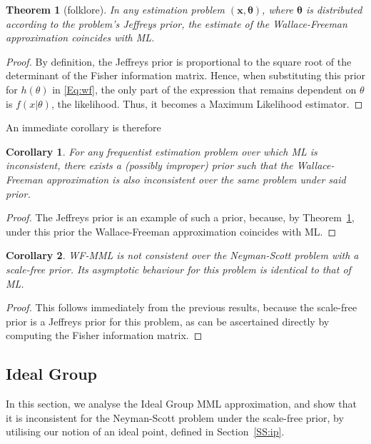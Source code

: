 \documentclass{IEEEtran}
\newtheorem{thm}{Theorem}
\newtheorem{cor}{Corollary}[thm]
\begin{document}
\begin{thm}[folklore]\label{T:mml}
In any estimation problem $(\mathbf{x},\boldsymbol{\theta})$, where
$\boldsymbol{\theta}$ is distributed according to the problem's Jeffreys prior,
the estimate of the Wallace-Freeman approximation coincides with ML.
\end{thm}

\begin{proof}
By definition, the Jeffreys prior is proportional to the square root of the
determinant of the Fisher information matrix.
Hence, when substituting this prior for $h(\theta)$ in \eqref{Eq:wf}, the
only part of the expression that remains dependent on $\theta$ is
$f(x|\theta)$, the likelihood. Thus, it becomes a Maximum Likelihood estimator.
\end{proof}

An immediate corollary is therefore
\begin{cor}\label{C:bad_prior}
For any frequentist estimation problem over which ML is inconsistent, there
exists a (possibly improper) prior such that the Wallace-Freeman approximation
is also inconsistent over the same problem under said prior.
\end{cor}

\begin{proof}
The Jeffreys prior is an example of such a prior, because, by
Theorem~\ref{T:mml}, under this prior the Wallace-Freeman approximation
coincides with ML.
\end{proof}

\begin{cor}
WF-MML is not consistent over the Neyman-Scott problem with a scale-free
prior. Its asymptotic behaviour for this problem is identical to that of ML.
\end{cor}

\begin{proof}
This follows immediately from the previous results, because the
scale-free prior is a Jeffreys prior for this problem, as can be ascertained
directly by computing the Fisher information matrix.
\end{proof}

\subsection{Ideal Group}\label{SS:idealgroup}

In this section, we analyse the Ideal Group MML approximation, and show that
it is inconsistent for the Neyman-Scott problem under the scale-free prior,
by utilising our notion of an ideal point, defined in Section~\ref{SS:ip}.
\end{document}
